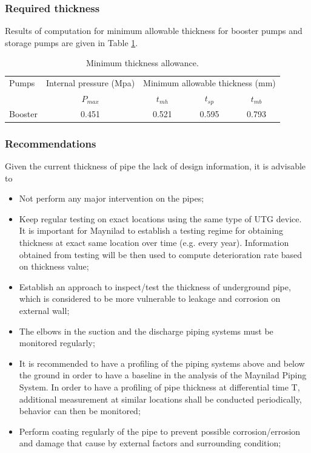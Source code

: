 \subsubsection{Required thickness}
Results of computation for minimum allowable thickness for booster pumps and storage pumps are given in Table \ref{ch05_tbl_minimuthickness}.

\begin{table}[h]
\caption{Minimum thickness allowance.}
\label{ch05_tbl_minimuthickness}
{\footnotesize

\begin{tabular}{l|l|l|l|l}
\hline
Pumps & \multicolumn{1}{c|}{Internal pressure  (Mpa)} & \multicolumn{3}{c}{Minimum allowable thickness (mm)} \\ 
\cline{3-5}
& \multicolumn{1}{c|}{$P_{max}$} & \multicolumn{1}{c|}{$t_{mh}$} & \multicolumn{1}{c|}{$t_{sp}$} & \multicolumn{1}{c}{$t_{mb}$} \\ 
\hline
Booster & \multicolumn{1}{c|}{0.451} & \multicolumn{1}{c|}{0.521} & \multicolumn{1}{c|}{0.595} & \multicolumn{1}{c}{0.793} \\ 
\hline
\end{tabular}

}
\end{table}






\subsubsection{Recommendations}
Given the current thickness of pipe the lack of design information, it is advisable to 
\begin{itemize}
\item Not perform any major intervention on the pipes;
\item Keep regular testing on exact locations using the same type of UTG device. It is important for Maynilad to establish a testing regime for obtaining thickness at exact same location over time (e.g. every year). Information obtained from testing will be then used to compute deterioration rate based on thickness value;
\item Establish an approach to inspect/test the thickness of underground pipe, which is considered to be more vulnerable to leakage and corrosion on external wall;
\item The elbows in the suction and the discharge piping systems must be monitored regularly;
\item It is recommended to have a profiling of the piping systems above and below the ground in order to have a baseline in the analysis of the Maynilad Piping System. In order to have a profiling of pipe thickness at differential time T, additional measurement at similar locations shall be conducted periodically, behavior can then be monitored;
\item Perform coating regularly of the pipe to prevent possible corrosion/errosion and damage that cause by external factors and surrounding condition;
\end{itemize}
%